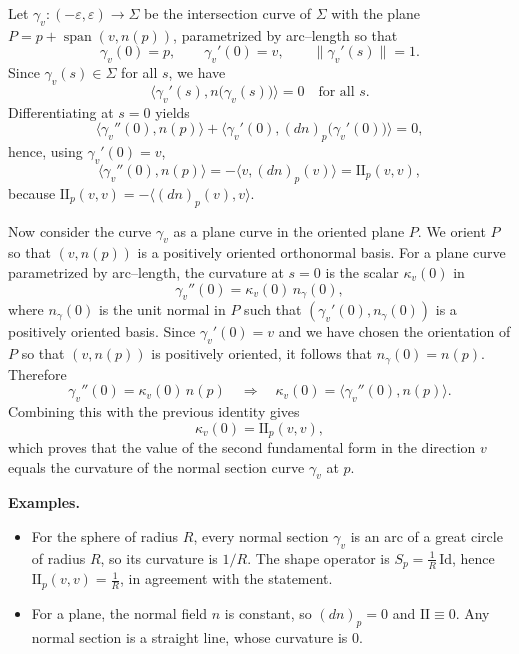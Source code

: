 \begin{solution}
Let $\gamma_v:(-\varepsilon,\varepsilon)\to\Sigma$ be the intersection curve of
	$\Sigma$ with the plane $P = p+\operatorname{span}(v,n(p))$, parametrized by arc--length
	so that
	\[
	\gamma_v(0)=p,\qquad \gamma_v'(0)=v,\qquad \|\gamma_v'(s)\|=1.
	\]
	Since $\gamma_v(s)\in\Sigma$ for all $s$, we have
	\[
	\big\langle \gamma_v'(s), n\bigl(\gamma_v(s)\bigr)\big\rangle = 0
	\quad\text{for all } s.
	\]
	Differentiating at $s=0$ yields
	\[
	\big\langle \gamma_v''(0), n(p)\big\rangle
	+ \big\langle \gamma_v'(0), (dn)_p\bigl(\gamma_v'(0)\bigr)\big\rangle = 0,
	\]
	hence, using $\gamma_v'(0)=v$,
	\[
	\big\langle \gamma_v''(0), n(p)\big\rangle
	= -\big\langle v,(dn)_p(v)\big\rangle
	= \mathrm{II}_p(v,v),
	\]
	because $\mathrm{II}_p(v,v) = -\langle (dn)_p(v),v\rangle$.
	
	Now consider the curve $\gamma_v$ as a plane curve in the oriented plane $P$.
	We orient $P$ so that $(v,n(p))$ is a positively oriented orthonormal basis.
	For a plane curve parametrized by arc--length, the curvature at $s=0$ is the
	scalar $\kappa_v(0)$ in
	\[
	\gamma_v''(0) = \kappa_v(0)\,n_\gamma(0),
	\]
	where $n_\gamma(0)$ is the unit normal in $P$ such that
	$(\gamma_v'(0),n_\gamma(0))$ is a positively oriented basis.  Since
	$\gamma_v'(0)=v$ and we have chosen the orientation of $P$ so that
	$(v,n(p))$ is positively oriented, it follows that $n_\gamma(0)=n(p)$.
	Therefore
	\[
	\gamma_v''(0) = \kappa_v(0)\,n(p)
	\quad\Longrightarrow\quad
	\kappa_v(0) = \big\langle \gamma_v''(0),n(p)\big\rangle.
	\]
	Combining this with the previous identity gives
	\[
	\kappa_v(0)=\mathrm{II}_p(v,v),
	\]
	which proves that the value of the second fundamental form in the direction $v$
	equals the curvature of the normal section curve $\gamma_v$ at $p$.
	
	\par\medskip\noindent\textbf{Examples.}\par\smallskip

	\begin{itemize}
		\item For the sphere of radius $R$, every normal section $\gamma_v$ is an arc
		of a great circle of radius $R$, so its curvature is $1/R$.  The shape
		operator is $S_p = \frac{1}{R}\,\mathrm{Id}$, hence
		$\mathrm{II}_p(v,v)=\frac{1}{R}$, in agreement with the statement.
		\item For a plane, the normal field $n$ is constant, so $(dn)_p=0$ and
		$\mathrm{II}\equiv 0$.  Any normal section is a straight line, whose
		curvature is $0$.
	\end{itemize}
\end{solution}

